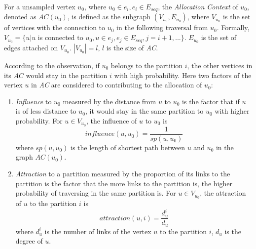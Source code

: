 \documentclass{sig-alternate-2013}
\begin{document}

\begin{definition}\label{def-ac}
For a unsampled vertex $u_0$, where $u_0\in{e_i}, e_i\in{E_{seq}}$,  the \textit{Allocation Context} of $u_0$, denoted as $AC(u_0)$, is defined as the subgraph
$(V_{u_0}, E_{u_0})$, where
$V_{u_0}$ is the set of vertices with  the connection to $u_0$ in the following traversal from $u_0$. Formally, $V_{u_0}=\{u | u$ is connected to $u_0, u\in e_{j}, e_{j}\in E_{seq},  j=i+1,...\}$.
$E_{u_0}$ is the set of edges attached on $V_{u_0}$.
$|V_{u_0}|=l$, $l$ is the size of \textit{AC}.
\end{definition}

According to the observation, if $u_0$ belongs to the partition $i$, the other vertices in its $AC$ would stay in the partition $i$ with high probability. Here two factors of the vertex $u$ in \textit{AC} are considered to contributing to the allocation of $u_0$:
\begin{enumerate}[(1)]
\item \textit{Influence} to $u_0$ measured by  the distance from $u$ to $u_0$ is the factor that if $u$ is of less distance to $u_0$, it would stay in the same partition to $u_0$ with higher probability. For $u\in{V_{u_0}}$, the influence of $u$ to $u_0$ is
\begin{equation}\label{eq-influence}
influence(u, u_0)=\frac{1}{sp(u, u_0)}
\end{equation}
where $sp(u, u_0)$ is the length of shortest path between $u$ and $u_0$ in the graph $AC(u_0)$.

\item \textit{Attraction} to a partition measured by the proportion of its links to the partition is the factor that the more links to the partition is, the higher probability of traversing in the same partition is. For $u\in{V_{u_0}}$, the attraction of $u$ to the partition $i$ is
\begin{equation}\label{eq-attraction}
attraction(u, i)=\frac{d_{u}^{i}}{d_{u}}
\end{equation}
where $d_{u}^{i}$ is the number of links of the vertex $u$ to the partition $i$, $d_{u}$ is the degree of $u$.
\end{enumerate}
\end{document}
